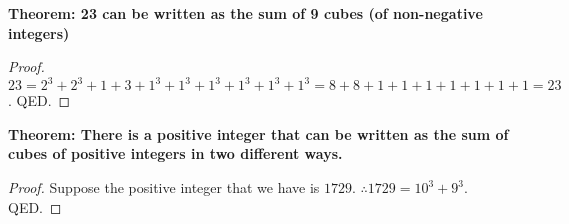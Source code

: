 \begin{example}
    \textbf{Theorem: 23 can be written as the sum of 9 cubes (of non-negative integers)}
\end{example}

\begin{proof}
    $23= 2^3+ 2^3 + 1+3 + 1^3 + 1^3 + 1^3 + 1^3 + 1^3 + 1^3 = 8 + 8 + 1 + 1+1+1+1+1+1=23$. QED.
\end{proof}

\begin{example}
    \textbf{Theorem: There is a positive integer that can be written as the sum of cubes of positive integers in two different ways.}
\end{example}

\begin{proof}
    Suppose the positive integer that we have is $1729$. $\therefore 1729=10^3+9^3$. QED.
\end{proof}